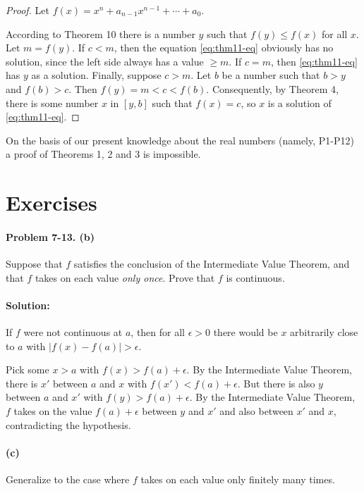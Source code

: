 \documentclass{article}
\begin{document}
\begin{proof}
  Let $f(x) = x^n + a_{n-1}x^{n-1} + \cdots + a_0$.

  According to Theorem 10 there is a number $y$ such that $f(y) \leq f(x)$ for
  all $x$. Let $m = f(y)$. If $c < m$, then the equation \eqref{eq:thm11-eq}
  obviously has no solution, since the left side always has a value $\geq m$.
  If $c = m$, then \eqref{eq:thm11-eq} has $y$ as a solution. Finally,
  suppose $c > m$. Let $b$ be a number such that $b > y$ and $f(b) > c$. Then
  $f(y) = m < c < f(b)$. Consequently, by Theorem 4, there is some number $x$
  in $[y, b]$ such that $f(x) = c$, so $x$ is a solution of
  \eqref{eq:thm11-eq}.
\end{proof}

On the basis of our present knowledge about the real numbers (namely, P1-P12)
a proof of Theorems 1, 2 and 3 is impossible.

\section*{Exercises}

\paragraph{Problem 7-13. (b)} Suppose that $f$ satisfies the conclusion of the
Intermediate Value Theorem, and that $f$ takes on each value \emph{only once}.
Prove that $f$ is continuous.

\paragraph{Solution:} If $f$ were not continuous at $a$, then for all
$\epsilon > 0$ there would be $x$ arbitrarily close to $a$ with $|f(x) - f(a)|
> \epsilon$.

Pick some $x > a$ with $f(x) > f(a) + \epsilon$. By the Intermediate Value
Theorem, there is $x'$ between $a$ and $x$ with $f(x') < f(a) + \epsilon$. But
there is also $y$ between $a$ and $x'$ with $f(y) > f(a) + \epsilon$. By the
Intermediate Value Theorem, $f$ takes on the value $f(a) + \epsilon$ between
$y$ and $x'$ and also between $x'$ and $x$, contradicting the hypothesis.

\paragraph{(c)} Generalize to the case where $f$ takes on each value only
finitely many times.
\end{document}
